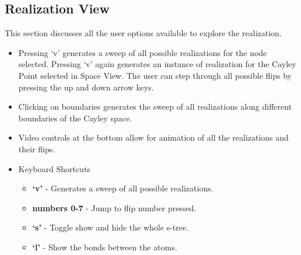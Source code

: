\documentclass[10pt]{article}
\begin{document}
\subsection{Realization View}
This section discusses all the user options available to explore the realization.
\begin{itemize}
		\item Pressing `v' generates a sweep of all possible realizations for
				the node selected.  Pressing `v' again generates an instance of
				realization for the Cayley Point selected in Space View.  The
				user can step through all possible flips by pressing the up and
				down arrow keys.
		\item Clicking on boundaries generates the sweep of all realizations
				along different boundaries of the Cayley space.
		\item Video controls at the bottom allow for animation of all the
				realizations and their flips.
		\item Keyboard Shortcuts
				\begin{itemize}
						\item \textbf{`v'} - Generates a sweep of all possible
								realizations. 
						\item \textbf{numbers 0-7} - Jump to flip number
								pressed. 
						\item \textbf{`s'} - Toggle show and hide the whole
								s-tree.
						\item \textbf{`l'} - Show the bonds between the atoms.
				\end{itemize}
\end{itemize}
\end{document}
